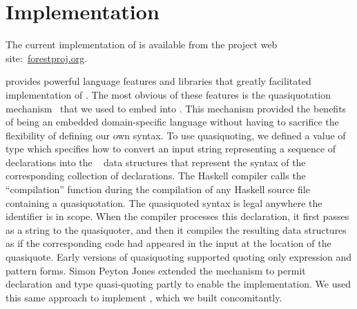 \section{Implementation}
\label{sec:implementation}

The current implementation of \forest{} is available from the project web
site:~\url{forestproj.org}. 

\haskell{} provides powerful language features and libraries that
greatly facilitated implementation of \forest{}.  The most obvious
of these features is the quasiquotation mechanism~\cite{Mainland:quasi}
that we used to embed \forest{} into \haskell{}.  This mechanism
provided the benefits of being an embedded domain-specific
language without having to sacrifice the flexibility of
defining our own syntax. To use quasiquoting, we defined a \haskell{}
value  of type  which specifies how to
convert an input string representing a sequence of \forest{} declarations into the
\template{}~\cite{Sheard+:templatehaskell} 
data structures that represent the syntax of the
corresponding collection of \haskell{} declarations.
The Haskell compiler calls the  ``compilation'' function 
during the compilation of any Haskell source file containing a \forest{} quasiquotation.
The quasiquoted syntax 
is legal anywhere the identifier  is in scope.
When the \haskell{} compiler processes this declaration, it first
passes  as a string to the  quasiquoter, and
then it compiles the resulting \template{} data structures as if the
corresponding \haskell{} code had appeared in the input at the
location of the quasiquote.  Early versions of quasiquoting
supported quoting only expression and pattern forms.  Simon Peyton
Jones extended the mechanism to permit declaration and type
quasi-quoting partly to enable the \forest{} implementation.  We used
this same approach to implement \padshaskell{}, which we built
concomitantly.  

